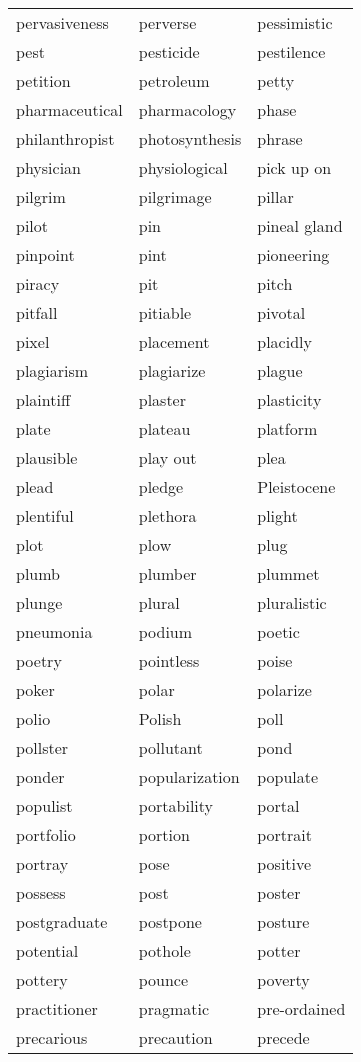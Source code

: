 \documentclass{minimal}
\begin{document}
\begin{longtable}{p{2.7cm}@{\hskip 0.2cm}p{2.7cm}@{\hskip 0.2cm}p{2.7cm}}
pervasiveness & perverse & pessimistic \\
pest & pesticide & pestilence \\
petition & petroleum & petty \\
pharmaceutical & pharmacology & phase \\
philanthropist & photosynthesis & phrase \\
physician & physiological & pick up on \\
pilgrim & pilgrimage & pillar \\
pilot & pin & pineal gland \\
pinpoint & pint & pioneering \\
piracy & pit & pitch \\
pitfall & pitiable & pivotal \\
pixel & placement & placidly \\
plagiarism & plagiarize & plague \\
plaintiff & plaster & plasticity \\
plate & plateau & platform \\
plausible & play out & plea \\
plead & pledge & Pleistocene \\
plentiful & plethora & plight \\
plot & plow & plug \\
plumb & plumber & plummet \\
plunge & plural & pluralistic \\
pneumonia & podium & poetic \\
poetry & pointless & poise \\
poker & polar & polarize \\
polio & Polish & poll \\
pollster & pollutant & pond \\
ponder & popularization & populate \\
populist & portability & portal \\
portfolio & portion & portrait \\
portray & pose & positive \\
possess & post & poster \\
postgraduate & postpone & posture \\
potential & pothole & potter \\
pottery & pounce & poverty \\
practitioner & pragmatic & pre-ordained \\
precarious & precaution & precede \\

\end{longtable}
\end{document}
